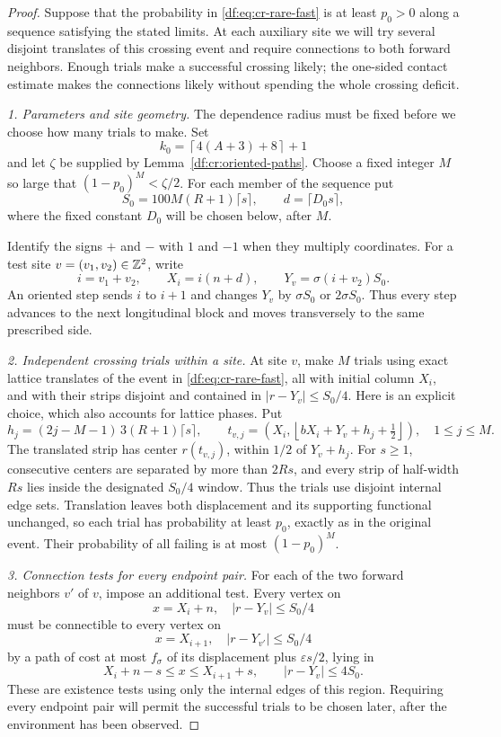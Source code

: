\begin{proof}
Suppose that the probability in \eqref{df:eq:cr-rare-fast} is at least
$p_0>0$ along a sequence satisfying the stated limits. At each auxiliary
site we will try several disjoint translates of this crossing event and
require connections to both forward neighbors. Enough trials make a
successful crossing likely; the one-sided contact estimate makes the
connections likely without spending the whole crossing deficit.

\emph{1. Parameters and site geometry.}
The dependence radius must be fixed before we choose how many trials to
make. Set
\[
 k_0=\left\lceil4(A+3)+8\right\rceil+1
\]
and let $\zeta$ be supplied by Lemma~\ref{df:cr:oriented-paths}. Choose a
fixed integer $M$ so large that $(1-p_0)^M<\zeta/2$. For each member of
the sequence put
\[
 S_0=100M(R+1)\lceil s\rceil,
 \qquad d=\lceil D_0s\rceil,
\]
where the fixed constant $D_0$ will be chosen below, after $M$.

Identify the signs $+$ and $-$ with $1$ and $-1$ when they multiply
coordinates. For a test site $v=(v_1,v_2)\in\mathbb Z^2$, write
\[
 i=v_1+v_2,
 \qquad X_i=i(n+d),
 \qquad Y_v=\sigma(i+v_2)S_0.
\]
An oriented step sends $i$ to $i+1$ and changes $Y_v$ by $\sigma S_0$
or $2\sigma S_0$. Thus every step advances to the next longitudinal
block and moves transversely to the same prescribed side.

\emph{2. Independent crossing trials within a site.}
At site $v$, make $M$ trials using exact lattice translates of the event
in \eqref{df:eq:cr-rare-fast}, all with initial column $X_i$, and with their
strips disjoint and contained in $|r-Y_v|\le S_0/4$. Here is an explicit
choice, which also accounts for lattice phases. Put
\[
 h_j=(2j-M-1)\,3(R+1)\lceil s\rceil,
 \qquad
 t_{v,j}=\left(X_i,
    \left\lfloor bX_i+Y_v+h_j+\tfrac12\right\rfloor\right),
 \quad 1\le j\le M.
\]
The translated strip has center $r(t_{v,j})$, within $1/2$ of
$Y_v+h_j$. For $s\ge1$, consecutive centers are separated by more than
$2Rs$, and every strip of half-width $Rs$ lies inside the designated
$S_0/4$ window. Thus the trials use disjoint internal edge sets.
Translation leaves both displacement and its supporting functional
unchanged, so each trial has probability at least $p_0$, exactly as in
the original event. Their probability of all failing is at most
$(1-p_0)^M$.

\emph{3. Connection tests for every endpoint pair.}
For each of the two forward neighbors $v'$ of $v$, impose an additional
test. Every vertex on
\[
 x=X_i+n,\quad |r-Y_v|\le S_0/4
\]
must be connectible to every vertex on
\[
 x=X_{i+1},\quad |r-Y_{v'}|\le S_0/4
\]
by a path of cost at most $f_\sigma$ of its displacement plus
$\varepsilon s/2$, lying in
\begin{equation}\label{df:eq:cr-connector-region}
 X_i+n-s\le x\le X_{i+1}+s,
 \qquad |r-Y_v|\le4S_0.
\end{equation}
These are existence tests using only the internal edges of this region.
Requiring every endpoint pair will permit the successful trials to be
chosen later, after the environment has been observed.


\end{proof}
